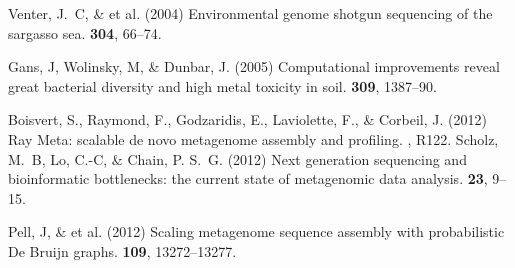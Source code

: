 \documentclass{pnastwo}
\begin{document}
\begin{article}
\begin{thebibliography}{10}
 Venter, J.~C, \& et al. \newblock (2004) Environmental genome shotgun sequencing of the sargasso
sea.  {\bf 304}, 66--74.
%

 Gans, J, Wolinsky, M, \& Dunbar, J. \newblock (2005)
Computational improvements reveal great bacterial diversity and high metal
toxicity in soil.  {\bf 309}, 1387--90.

 Boisvert, S., Raymond, F., Godzaridis, E., Laviolette, F., \& Corbeil, J. \newblock (2012) Ray Meta:
scalable de novo metagenome assembly and profiling. , R122.
 Scholz, M.~B, Lo, C.-C, \& Chain, P. S.~G. \newblock
(2012) Next generation sequencing and bioinformatic bottlenecks: the current
state of metagenomic data analysis.  {\bf 23}, 9--15.
%
%

 Pell, J, \& et al. \newblock (2012) {Scaling metagenome sequence assembly
with probabilistic De Bruijn graphs}.  {\bf 109}, 13272--13277.

%



\end{thebibliography}
\end{article}
\end{document}
